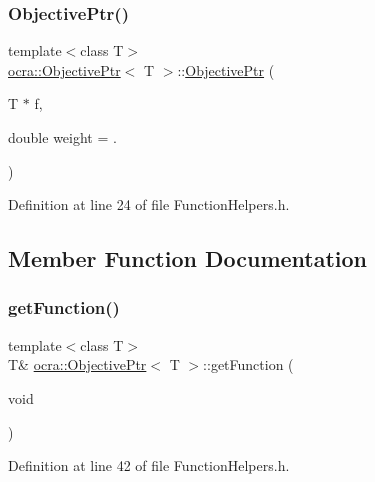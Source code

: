 \subsubsection{\texorpdfstring{Objective\+Ptr()}{ObjectivePtr()}\hspace{0.1cm}{\footnotesize\ttfamily [2/2]}}
{\footnotesize\ttfamily template$<$class T$>$ \\
\hyperlink{classocra_1_1ObjectivePtr}{ocra\+::\+Objective\+Ptr}$<$ T $>$\+::\hyperlink{classocra_1_1ObjectivePtr}{Objective\+Ptr} (\begin{DoxyParamCaption}\item[{T $\ast$}]{f,  }\item[{double}]{weight = {.} }\end{DoxyParamCaption})\hspace{0.3cm}{\ttfamily [inline]}}



Definition at line 24 of file Function\+Helpers.\+h.



\subsection{Member Function Documentation}
\hypertarget{classocra_1_1ObjectivePtr_a8e8083b5a5583ec3fb24d002791ac1dd}{}\label{classocra_1_1ObjectivePtr_a8e8083b5a5583ec3fb24d002791ac1dd} 
\subsubsection{\texorpdfstring{get\+Function()}{getFunction()}\hspace{0.1cm}{\footnotesize\ttfamily [1/2]}}
{\footnotesize\ttfamily template$<$class T$>$ \\
T\& \hyperlink{classocra_1_1ObjectivePtr}{ocra\+::\+Objective\+Ptr}$<$ T $>$\+::get\+Function (\begin{DoxyParamCaption}\item[{void}]{ }\end{DoxyParamCaption})\hspace{0.3cm}{\ttfamily [inline]}}



Definition at line 42 of file Function\+Helpers.\+h.

\hypertarget{classocra_1_1ObjectivePtr_a3c73fca16c6d173bc6988957d72541a0}{}\label{classocra_1_1ObjectivePtr_a3c73fca16c6d173bc6988957d72541a0} 

